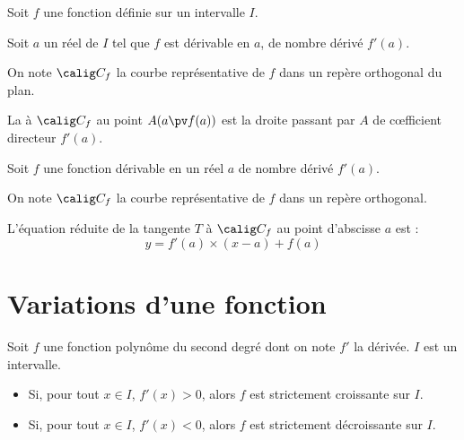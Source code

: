 \documentclass[10pt,openright,twoside,french]{book}
\begin{document}
\begin{Defi}
	Soit $f$ une fonction définie sur un intervalle $I$.\par
	Soit $a$ un réel de $I$ tel que $f$ est dérivable en $a$, de nombre dérivé $f'(a)$.\par
	On note $\calig C_f$ la courbe représentative de $f$ dans un repère orthogonal du plan.\par
	La  à $\calig C_f$ au point $A(a \pv f(a))$ est la droite passant par $A$ de c{\oe}fficient directeur $f'(a)$.

    \begin{center}
    \end{center}
\end{Defi}

\begin{Thm}
	Soit $f$ une fonction dérivable en un réel $a$ de nombre dérivé $f'(a)$.\par
	On note $\calig C_f$ la courbe représentative de $f$ dans un repère orthogonal.\par
	L'équation réduite de la tangente $T$ à $\calig C_f$ au point d'abscisse $a$ est :
	\[y = f'(a) \times (x - a) + f(a)\]
\end{Thm}

\section{Variations d'une fonction}

\begin{Thm}[(admis)]
    Soit $f$ une fonction polynôme du second degré dont on note $f'$ la dérivée. $I$ est un intervalle.
    \begin{itemize}
        \item Si, pour tout $x \in I$, $f' (x)> 0$, alors $f$ est strictement croissante sur $I$.
        \item Si, pour tout $x \in I$, $f' (x)< 0$, alors $f$ est strictement décroissante sur $I$.
    \end{itemize}
\end{Thm}
\end{document}
